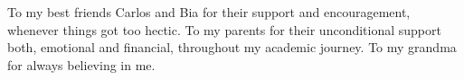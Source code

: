
%

\begin{ntdedicatory}

To my best friends Carlos and Bia for their support and encouragement, whenever things got too hectic.
To my parents for their unconditional support both, emotional and financial, throughout my academic journey.
To my grandma for always believing in me.


\end{ntdedicatory}